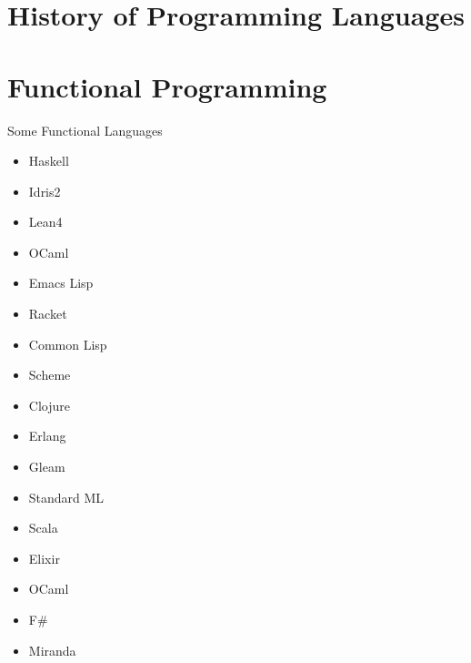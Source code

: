 \documentclass[pdf]{beamer}
\begin{document}
\begin{frame}

\end{frame}

\section{History of Programming Languages}
\label{sec:history}

\section{Functional Programming}
\label{sec:fp}

\begin{frame}{Some Functional Languages}
  \begin{itemize}
  \item Haskell
  \item Idris2
  \item Lean4
  \item OCaml
  \item Emacs Lisp
  \item Racket
  \item Common Lisp
  \item Scheme
  \item Clojure
  \item Erlang
  \item Gleam
  \item Standard ML
  \item Scala
  \item Elixir
  \item OCaml
  \item F\#
  \item Miranda
  \end{itemize}
\end{frame}
\end{document}
